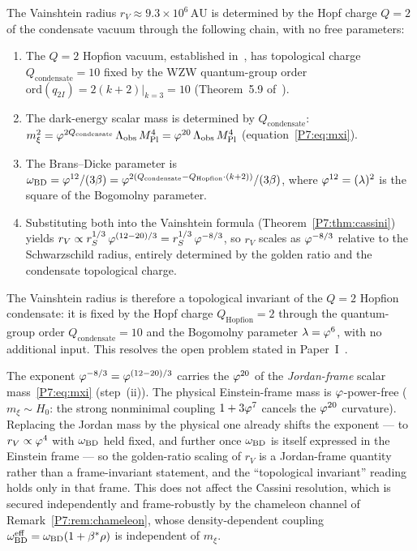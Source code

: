 \begin{corollary}
\label{P7:cor:vainshtein_topology}
The Vainshtein radius $r_V\approx9.3\times10^6\,\mathrm{AU}$ is
determined by the Hopf charge $Q=2$ of the condensate vacuum through
the following chain, with no free parameters:
\begin{enumerate}[noitemsep,label=\emph{(\roman*)}]
\item The $Q=2$ Hopfion vacuum, established in~\cite{Paper1}, has
  topological charge $Q_{\mathrm{condensate}}=10$ fixed by the
  WZW quantum-group order $\mathrm{ord}(q_{2I})=2(k+2)|_{k=3}=10$
  (Theorem~5.9 of~\cite{Paper1}).
\item The dark-energy scalar mass is determined by $Q_{\mathrm{condensate}}$:
  $m_\xi^2 = \varphi^{2Q_{\mathrm{condensate}}}\,\Lambda_{\mathrm{obs}}\,M_{\mathrm{Pl}}^4
  = \varphi^{20}\,\Lambda_{\mathrm{obs}}\,M_{\mathrm{Pl}}^4$ (equation~\eqref{P7:eq:mxi}).
\item The Brans--Dicke parameter is $\omega_{\mathrm{BD}}=\varphi^{12}/(3\beta)
  = \varphi^{2(Q_{\mathrm{condensate}}-Q_{\mathrm{Hopfion}}\cdot(k+2))}/(3\beta)$,
  where $\varphi^{12}=(\lambda)^2$ is the square of the Bogomolny parameter.
\item Substituting both into the Vainshtein formula (Theorem~\ref{P7:thm:cassini})
  yields $r_V\propto r_S^{1/3}\,\varphi^{(12-20)/3}=r_S^{1/3}\,\varphi^{-8/3}$,
  so $r_V$ scales as $\varphi^{-8/3}$ relative to the Schwarzschild radius,
  entirely determined by the golden ratio and the condensate topological charge.
\end{enumerate}
The Vainshtein radius is therefore a topological invariant of the $Q=2$
Hopfion condensate: it is fixed by the Hopf charge $Q_{\mathrm{Hopfion}}=2$
through the quantum-group order $Q_{\mathrm{condensate}}=10$ and the
Bogomolny parameter $\lambda=\varphi^6$, with no additional input.
This resolves the open problem stated in Paper~I~\cite{Paper1}.
\end{corollary}

\begin{remark}
\label{P7:rem:rV_frame}
The exponent $\varphi^{-8/3}=\varphi^{(12-20)/3}$ carries the $\varphi^{20}$ of
the \emph{Jordan-frame} scalar mass~\eqref{P7:eq:mxi} (step~(ii)). The
physical Einstein-frame mass is $\varphi$-power-free ($m_\xi\sim H_0$: the
strong nonminimal coupling $1+3\varphi^7$ cancels the $\varphi^{20}$
curvature). Replacing the Jordan mass by the physical one already
shifts the exponent --- to $r_V\propto\varphi^4$ with $\omega_{\mathrm{BD}}$ held fixed,
and further once $\omega_{\mathrm{BD}}$ is itself expressed in the Einstein frame ---
so the golden-ratio scaling of $r_V$ is a Jordan-frame quantity rather
than a frame-invariant statement, and the ``topological invariant''
reading holds only in that frame. This does not affect the Cassini
resolution, which is secured independently and frame-robustly by the
chameleon channel of Remark~\ref{P7:rem:chameleon}, whose
density-dependent coupling $\omega_{\mathrm{BD}}^{\mathrm{eff}}=\omega_{\mathrm{BD}}(1+\beta^{*}\rho)$ is
independent of $m_\xi$.
\end{remark}

